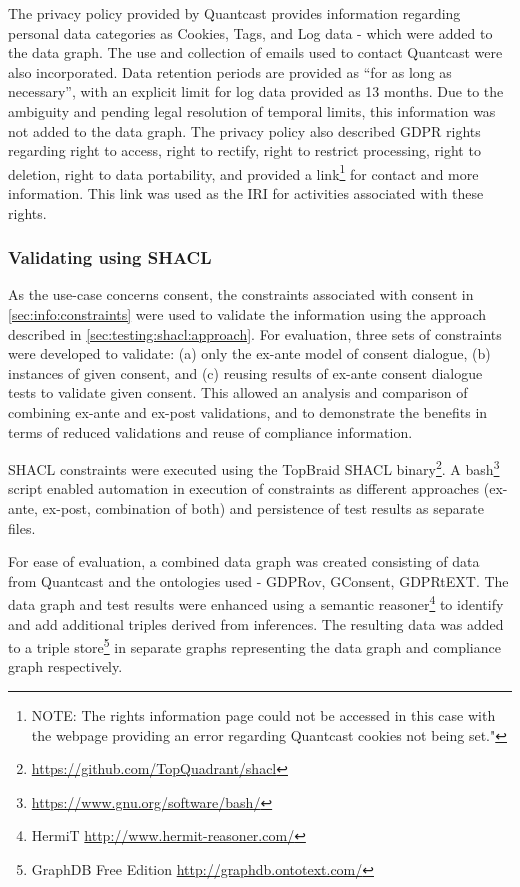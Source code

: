 The privacy policy provided by Quantcast provides information regarding personal data categories as Cookies, Tags, and Log data - which were added to the data graph. 
The use and collection of emails used to contact Quantcast were also incorporated.
Data retention periods are provided as ``for as long as necessary'', with an explicit limit for log data provided as 13 months. Due to the ambiguity and pending legal resolution of temporal limits, this information was not added to the data graph.
The privacy policy also described GDPR rights regarding right to access, right to rectify, right to restrict processing, right to deletion, right to data portability, and provided a link\footnote{NOTE: The rights information page could not be accessed in this case with the webpage providing an error regarding Quantcast cookies not being set."} for contact and more information. This link was used as the IRI for activities associated with these rights.

\subsubsection{Validating using SHACL}
As the use-case concerns consent, the constraints associated with consent in \autoref{sec:info:constraints} were used to validate the information using the approach described in \autoref{sec:testing:shacl:approach}.
For evaluation, three sets of constraints were developed to validate: (a) only the ex-ante model of consent dialogue, (b) instances of given consent, and (c) reusing results of ex-ante consent dialogue tests to validate given consent.
This allowed an analysis and comparison of combining ex-ante and ex-post validations, and to demonstrate the benefits in terms of reduced validations and reuse of compliance information.

SHACL constraints were executed using the TopBraid SHACL binary\footnote{\url{https://github.com/TopQuadrant/shacl}}.
A bash\footnote{\url{https://www.gnu.org/software/bash/}} script enabled automation in execution of constraints as different approaches (ex-ante, ex-post, combination of both) and persistence of test results as separate files.

For ease of evaluation, a combined data graph was created consisting of data from Quantcast and the ontologies used - GDPRov, GConsent, GDPRtEXT. 
The data graph and test results were enhanced using a semantic reasoner\footnote{HermiT \url{http://www.hermit-reasoner.com/}} to identify and add additional triples derived from inferences.
The resulting data was added to a triple store\footnote{GraphDB Free Edition \url{http://graphdb.ontotext.com/}} in separate graphs representing the data graph and compliance graph respectively.

